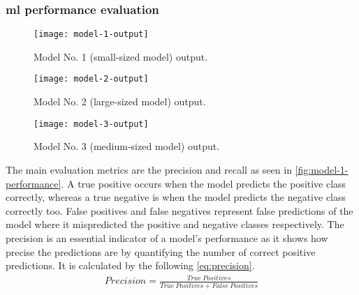 \documentclass[../main.tex]{subfiles}
\begin{document}

\subsubsection{\gls{ml} performance evaluation}



\begin{figure}[tbp] 
	\centering
	\texttt{[image: model-1-output]} 
        \caption{Model No. 1 (small-sized model) output.} \label{fig:model-1-output} 
\end{figure}

\begin{figure}[tbp] 
	\centering
	\texttt{[image: model-2-output]} 
        \caption{Model No. 2 (large-sized model) output.} \label{fig:model-2-output} 
\end{figure}

\begin{figure}[tbp] 
	\centering
	\texttt{[image: model-3-output]} 
        \caption{Model No. 3 (medium-sized model) output.} \label{fig:model-3-output} 
\end{figure}

The main evaluation metrics are the precision and recall
as seen in \cref{fig:model-1-performance}.
A true positive occurs when the model predicts the positive class correctly, whereas 
a true negative is when the model predicts the negative class correctly too. 
False positives and false negatives represent false predictions of the model 
where it mispredicted the positive and negative classes respectively.
The precision is an essential indicator of a model's performance as it shows 
how precise the predictions are by quantifying the number of correct positive predictions. 
It is calculated by the following \cref{eq:precision}. 
%
\begin{align}
    Precision =  \frac{True\ Positives}{True\ Positives + False\ Positives} \label{eq:precision}
\end{align}
\end{document}
